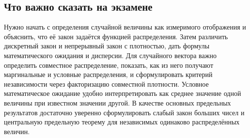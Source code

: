 \subsection{Что важно сказать на экзамене}

Нужно начать с определения случайной величины как измеримого отображения и
объяснить, что её закон задаётся функцией распределения. Затем различить
дискретный закон и непрерывный закон с плотностью, дать формулы математического
ожидания и дисперсии. Для случайного вектора важно определить совместное
распределение, показать, как из него получают маргинальные и условные
распределения, и сформулировать критерий независимости через факторизацию
совместной плотности. Условное математическое ожидание удобно интерпретировать
как среднее значение одной величины при известном значении другой. В качестве
основных предельных результатов достаточно уверенно сформулировать слабый закон
больших чисел и центральную предельную теорему для независимых одинаково
распределённых величин.

\newpage
